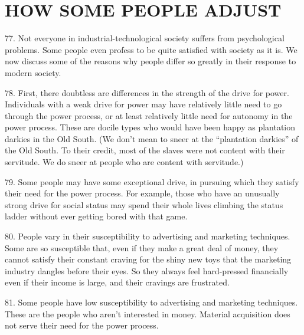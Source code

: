 \documentclass{article}
\begin{document}
\section{HOW SOME PEOPLE ADJUST}

\hspace{0.5cm} 77. Not everyone in industrial-technological society suffers from psychological problems. Some 
people even profess to be quite satisfied with society as it is. We now discuss some of the reasons 
why people differ so greatly in their response to modern society. \vspace{\baselineskip}

78. First, there doubtless are differences in the strength of the drive for power. Individuals with a 
weak drive for power may have relatively little need to go through the power process, or at least 
relatively little need for autonomy in the power process. These are docile types who would have 
been happy as plantation darkies in the Old South. (We don’t mean to sneer at the “plantation 
darkies” of the Old South. To their credit, most of the slaves were not content with their 
servitude. We do sneer at people who are content with servitude.) \vspace{\baselineskip}

79. Some people may have some exceptional drive, in pursuing which they satisfy their need for 
the power process. For example, those who have an unusually strong drive for social status may 
spend their whole lives climbing the status ladder without ever getting bored with that game. \vspace{\baselineskip} 

80. People vary in their susceptibility to advertising and marketing techniques. Some are so 
susceptible that, even if they make a great deal of money, they cannot satisfy their constant craving 
for the shiny new toys that the marketing industry dangles before their eyes. So they always feel 
hard-pressed financially even if their income is large, and their cravings are frustrated. \vspace{\baselineskip}

81. Some people have low susceptibility to advertising and marketing techniques. These are the 
people who aren’t interested in money. Material acquisition does not serve their need for the 
power process. \vspace{\baselineskip}
\end{document}
